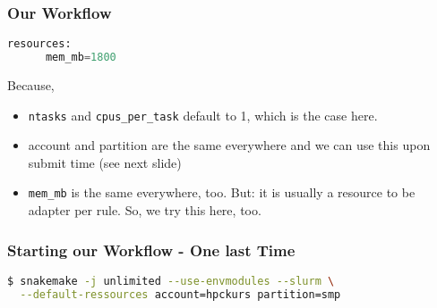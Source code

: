 \begin{frame}[fragile]
  \frametitle{Our Workflow}
  \begin{lstlisting}[language=Python,style=Python]
   resources:
      mem_mb=1800
  \end{lstlisting}
  \pause
  Because,
  \begin{itemize}
   \item \texttt{ntasks} and \texttt{cpus\_per\_task} default to 1, which is the case here.
   \item account and partition are the same everywhere and we can use this upon submit time (see next slide)
   \item \texttt{mem\_mb} is the same everywhere, too. But: it is usually a resource to be adapter per rule. So, we try this here, too.
  \end{itemize}
\end{frame}

\begin{frame}[fragile]
  \frametitle{Starting our Workflow - One last Time}
  \begin{lstlisting}[language=Bash,style=Shell]
$ snakemake -j unlimited --use-envmodules --slurm \
  --default-ressources account=hpckurs partition=smp
  \end{lstlisting}
\end{frame}

